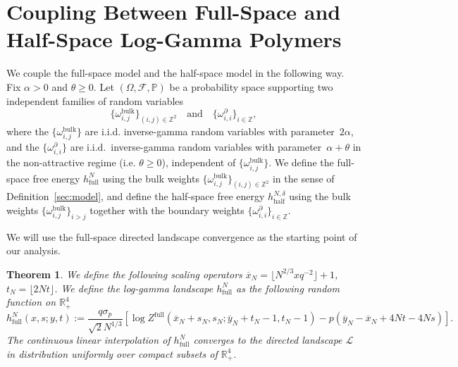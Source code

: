 \documentclass[11pt]{article}
\newtheorem{theorem}{Theorem}[section]
\theoremstyle{definition}
\newcommand{\R}{\mathbb{R}}
\newcommand{\Z}{\mathbb{Z}}
\newcommand{\Prob}{\mathbb{P}}
\begin{document}
\section{Coupling Between Full-Space and Half-Space Log-Gamma Polymers}
\label{sec:coupling}

We couple the full-space model and the half-space model in the following way. Fix $\alpha >0$ and $\theta \geq 0$. Let $(\Omega,\mathcal{F},\Prob)$ be a probability space supporting two independent families of random variables
\[
\{\omega^{\mathrm{bulk}}_{i,j}\}_{(i,j)\in\Z^2}
\quad\text{and}\quad
\{\omega^{\partial}_{i,i}\}_{i\in\Z},
\]
where the $\{\omega^{\mathrm{bulk}}_{i,j}\}$ are i.i.d. inverse-gamma random variables with parameter~$2\alpha$, and the $\{\omega^{\partial}_{i,i}\}$ are i.i.d.\ inverse-gamma random variables with parameter~$\alpha + \theta$ in the non-attractive regime (i.e. $\theta \geq 0$), independent of $\{\omega^{\mathrm{bulk}}_{i,j}\}$. We define the full-space free energy $h_{\mathrm{full}}^N$ using the bulk weights $\{\omega^{\mathrm{bulk}}_{i,j}\}_{(i,j)\in\Z^2}$ in the sense of Definition~\ref{sec:model}, and define the half-space free energy $h_{\mathrm{half}}^{N, \delta}$ using the bulk weights $\{\omega^{\mathrm{bulk}}_{i,j}\}_{i>j}$ together with the boundary weights $\{\omega^{\partial}_{i,i}\}_{i\in\Z}$.


We will use the full-space directed landscape convergence \cite[Theorem 1.6]{zhang2025convergence} as the starting point of our analysis.

\begin{theorem}
\label{thm_loggamma_full_to_DL}
We define the following scaling operators $\overline{x}_N = \lfloor N^{2/3}xq^{-2} \rfloor + 1$, $t_N = \lfloor 2Nt \rfloor$. We define the log-gamma landscape $h_{\mathrm{full}}^N$ as the following random function on $\R^4_+$
    \begin{equation}
        h_{\mathrm{full}}^N(x,s;y,t) := \frac{q\sigma_p}{\sqrt{2}N^{1/3}}\left[ \log Z^{\mathrm{full}}(\overline{x}_N + s_N, s_N;\overline{y}_N + t_N-1, t_N-1) -p\left( \overline{y}_N - \overline{x}_N + 4Nt-4Ns\right)\right].
    \end{equation}
    The continuous linear interpolation of $h_{\mathrm{full}}^N$ converges to the directed landscape $\mathcal{L}$ in distribution uniformly over compact subsets of $\R_+^4$.
\end{theorem}
\end{document}
